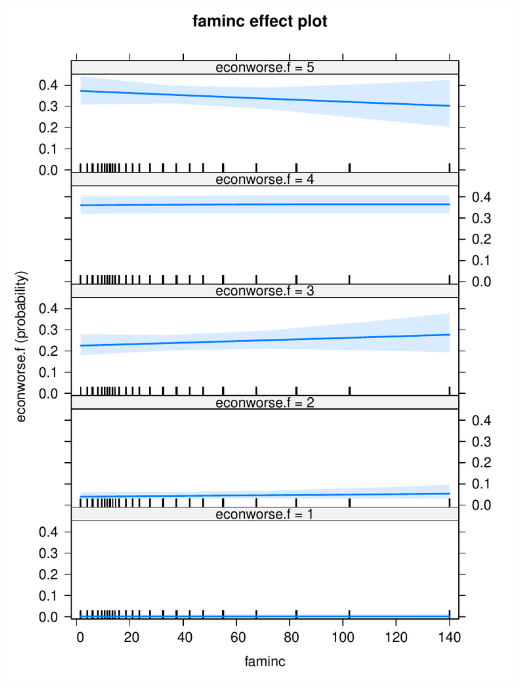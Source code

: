 \documentclass[onesided]{article}\usepackage[]{graphicx}\usepackage[]{color}
\makeatletter
\def\maxwidth{ %
  \ifdim\Gin@nat@width>\linewidth
    \linewidth
  \else
    \Gin@nat@width
  \fi
}
\newenvironment{knitrout}{}{} %
\makeatother
\begin{document}
\begin{knitrout}
{\centering \includegraphics[width=\maxwidth]{figure/pp-3} 

}



\end{knitrout}
\end{document}
